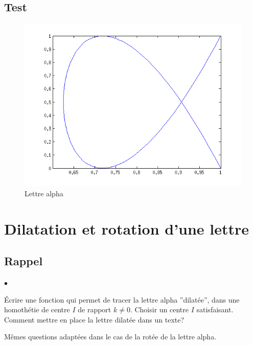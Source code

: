 \documentclass[a4paper,10pt]{report}
\begin{document}
\begin{center}
	
\end{center}

\newpage
\subsection*{Test}

\begin{figure}[h]
	\begin{center}
		\includegraphics[scale=0.6]{alpha}
		\caption{Lettre alpha}
	\end{center}
\end{figure}


\section*{Dilatation et rotation d'une lettre}

\subsection*{Rappel}

\begin{list}{$\bullet$}{}
\item Écrire une fonction qui permet de tracer la lettre alpha ”dilatée”, dans une homothétie de centre $I$ de rapport $k \neq 0$. Choisir un centre $I$ satisfaisant. Comment mettre en place la lettre dilatée dans un texte?

\item Mêmes questions adaptées dans le cas de la rotée de la lettre alpha.

\end{list}
\end{document}
